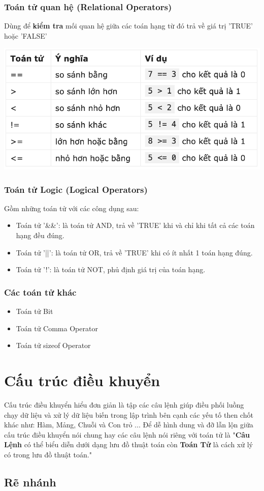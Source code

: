\documentclass[12pt,a4paper]{article}
\begin{document}
\subsubsection{Toán tử quan hệ (Relational Operators)}
Dùng để \textbf{kiểm tra} mối quan hệ giữa các toán hạng từ đó trả về giá trị 'TRUE' hoặc 'FALSE'
\begin{center}
	\includegraphics[scale =0.7]{RelationalOperators}
\end{center}
\subsubsection{Toán tử Logic (Logical Operators)}
Gồm những toán tử với các công dụng sau:
\begin{itemize}
	\item Toán tử '\&\&': là toán tử AND, trả về 'TRUE' khi và chỉ khi tất cả các toán hạng đều đúng.
	\item Toán tử '||': là toán tử OR, trả về 'TRUE' khi có ít nhất 1 toán hạng đúng.
	\item Toán tử '!': là toán tử NOT, phủ định giá trị của toán hạng.
\end{itemize}
\subsubsection{Các toán tử khác }
\begin{itemize}
	\item Toán tử Bit
	\item Toán tử Comma Operator
	\item Toán tử sizeof Operator
\end{itemize}
\section{Cấu trúc điều khuyển}
Cấu trúc điều khuyển hiểu đơn giản là tập các câu lệnh giúp điều phối luồng chạy dữ liệu và xử lý dữ liệu biến trong lập trình bên cạnh các yếu tố then chốt khác như: Hàm, Mảng, Chuỗi và Con trỏ ... Để dễ hình dung và đỡ lẫn lộn giữa cấu trúc điều khuyển nói chung hay các câu lệnh nói riêng với toán tử là "\textbf{Câu Lệnh} có thể biểu diễn dưới dạng lưu đồ thuật toán còn \textbf{Toán Tử} là cách xử lý có trong lưu đồ thuật toán."
\begin{center}
\section*{Rẽ nhánh}	
\end{center}
\end{document}
